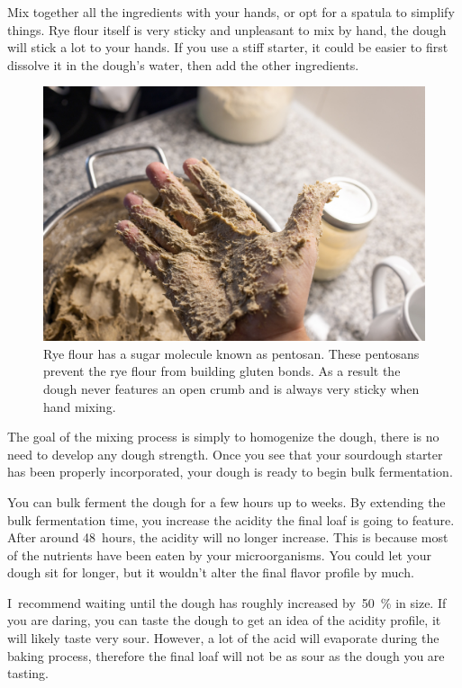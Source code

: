 Mix together all the ingredients with your hands, or opt for a spatula to
simplify things. Rye flour itself is very sticky and unpleasant to mix by
hand, the dough will stick a lot to your hands. If you use a stiff starter, it
could be easier to first dissolve it in the dough's water, then add the other
ingredients.

\begin{figure}[!htb]
  \includegraphics[width=\textwidth]{sticky-hands}
  \caption[Sticky rye dough]{Rye flour has a sugar molecule known as pentosan.
      These pentosans prevent the rye flour from building gluten bonds. As a
      result the dough never features an open crumb and is always very sticky
      when hand mixing.}%
  \label{fig:non-wheat-sticky-hands}
\end{figure}

The goal of the mixing process is simply to homogenize the dough, there
is no need to develop any dough strength. Once you see that
your sourdough starter has been properly incorporated, your
dough is ready to begin bulk fermentation.

You can bulk ferment the dough for a few hours up to
weeks. By extending the bulk fermentation time, you increase
the acidity the final loaf is going to feature. After around
48~hours, the acidity will no longer increase. This is because
most of the nutrients have been eaten by your microorganisms.
You could let your dough sit for longer, but it wouldn't alter the
final flavor profile by much.

I~recommend waiting until the dough has roughly increased
by~\qty{50}{\percent} in size. If you are daring, you can taste the dough to
get an idea of the acidity profile, it will likely taste very sour. However, a
lot of the acid will evaporate during the baking process, therefore the final
loaf will not be as sour as the dough you are tasting.

